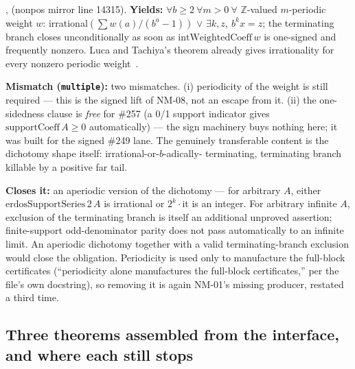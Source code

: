 \begin{obs} 
,
(nonpos mirror line 14315).
\textbf{Yields:} $\forall b\ge2\ \forall m{>}0\ \forall$ $\mathbb Z$-valued $m$-periodic weight
$w$: irrational$(\sum w(a)/(b^a-1))$ $\vee$ $\exists k,z,\ b^k x=z$; the terminating branch closes
unconditionally as soon as $\mathrm{intWeightedCoeff}\,w$ is one-signed and frequently nonzero.
Luca and Tachiya's theorem already gives irrationality for every nonzero periodic
weight~\cite[Theorem~A, p.~139]{lucatachiya2017}.

\par\medskip

\textbf{Mismatch (\texttt{multiple}):} two mismatches. (i) periodicity of the weight is still
required — this is the signed lift of NM-08, not an escape from it. (ii) the one-sidedness clause
is \emph{free} for \#257 (a 0/1 support indicator gives $\mathrm{supportCoeff}\,A\ge0$
automatically) — the sign machinery buys nothing here; it was built for the signed \#249 lane.
The genuinely transferable content is the dichotomy shape itself: irrational-or-$b$-adically-
terminating, terminating branch killable by a positive far tail.

\par\medskip

\textbf{Closes it:} an aperiodic version of the dichotomy — for arbitrary $A$, either
$\mathrm{erdosSupportSeries}\,2\,A$ is irrational or $2^k\cdot$it is an integer. For arbitrary infinite $A$, exclusion of the terminating branch is itself an additional unproved
assertion; finite-support odd-denominator parity does not pass automatically to an infinite limit.
An aperiodic dichotomy together with a valid terminating-branch exclusion would close the
obligation. Periodicity is used only to manufacture the full-block certificates
(``periodicity alone manufactures the full-block certificates,'' per the file's own docstring),
so removing it is again NM-01's missing producer, restated a third time.
\end{obs}

\subsection{Three theorems assembled from the interface, and where each still stops}

